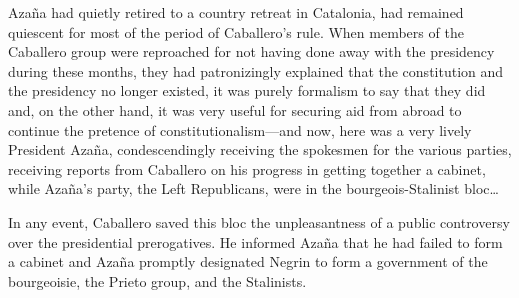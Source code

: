 Azaña had quietly retired to a country retreat in Catalonia, had remained quiescent for most of the period of Caballero’s rule. When members of the Caballero group were reproached for not having done away with the presidency during these months, they had patronizingly explained that the constitution and the presidency no longer existed, it was purely formalism to say that they did and, on the other hand, it was very useful for securing aid from abroad to continue the pretence of constitutionalism---and now, here was a very lively President Azaña, condescendingly receiving the spokesmen for the various parties, receiving reports from Caballero on his progress in getting together a cabinet, while Azaña’s party, the Left Republicans, were in the bourgeois-Stalinist bloc\dots

In any event, Caballero saved this bloc the unpleasantness of a public controversy over the presidential prerogatives. He informed Azaña that he had failed to form a cabinet and Azaña promptly designated Negrin to form a government of the bourgeoisie, the Prieto group, and the Stalinists.